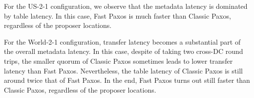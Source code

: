 %
%

%

For the US-2-1 configuration, we observe that the metadata latency is dominated by table latency. In this case, Fast Paxos is much faster than Classic Paxos, regardless of the proposer locations.

For the World-2-1 configuration, transfer latency becomes a substantial part of the overall metadata latency. In this case, despite of taking two cross-DC round trips, the smaller quorum of Classic Paxos sometimes leads to lower transfer latency than Fast Paxos. Nevertheless, the table latency of Classic Paxos is still around twice that of Fast Paxos. In the end, Fast Paxos turns out still faster than Classic Paxos, regardless of the proposer locations.

